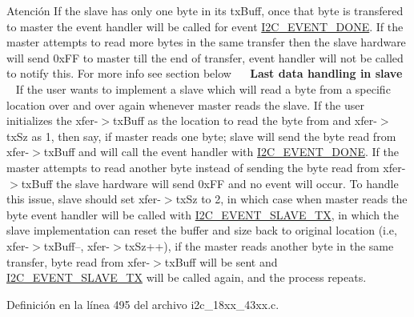 \begin{DoxyWarning}{Atención}
If the slave has only one byte in its tx\+Buff, once that byte is transfered to master the event handler will be called for event \hyperlink{i2c__18xx__43xx_8h_gacb2cd4e03ea48339d327e4f387441bf3a43d00f7d92100d4af6df5514e4ccf1d1}{I2\+C\+\_\+\+E\+V\+E\+N\+T\+\_\+\+D\+O\+NE}. If the master attempts to read more bytes in the same transfer then the slave hardware will send 0x\+FF to master till the end of transfer, event handler will not be called to notify this. For more info see section below~\newline
 ~\newline
{\bfseries  Last data handling in slave }~\newline
 If the user wants to implement a slave which will read a byte from a specific location over and over again whenever master reads the slave. If the user initializes the xfer-\/$>$tx\+Buff as the location to read the byte from and xfer-\/$>$tx\+Sz as 1, then say, if master reads one byte; slave will send the byte read from xfer-\/$>$tx\+Buff and will call the event handler with \hyperlink{i2c__18xx__43xx_8h_gacb2cd4e03ea48339d327e4f387441bf3a43d00f7d92100d4af6df5514e4ccf1d1}{I2\+C\+\_\+\+E\+V\+E\+N\+T\+\_\+\+D\+O\+NE}. If the master attempts to read another byte instead of sending the byte read from xfer-\/$>$tx\+Buff the slave hardware will send 0x\+FF and no event will occur. To handle this issue, slave should set xfer-\/$>$tx\+Sz to 2, in which case when master reads the byte event handler will be called with \hyperlink{i2c__18xx__43xx_8h_gacb2cd4e03ea48339d327e4f387441bf3a3911d9b6505f77f0bed3f21b2710ca58}{I2\+C\+\_\+\+E\+V\+E\+N\+T\+\_\+\+S\+L\+A\+V\+E\+\_\+\+TX}, in which the slave implementation can reset the buffer and size back to original location (i.\+e, xfer-\/$>$tx\+Buff--, xfer-\/$>$tx\+Sz++), if the master reads another byte in the same transfer, byte read from xfer-\/$>$tx\+Buff will be sent and \hyperlink{i2c__18xx__43xx_8h_gacb2cd4e03ea48339d327e4f387441bf3a3911d9b6505f77f0bed3f21b2710ca58}{I2\+C\+\_\+\+E\+V\+E\+N\+T\+\_\+\+S\+L\+A\+V\+E\+\_\+\+TX} will be called again, and the process repeats. 
\end{DoxyWarning}


Definición en la línea 495 del archivo i2c\+\_\+18xx\+\_\+43xx.\+c.

